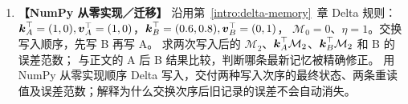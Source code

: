 \begin{enumerate}[label={},leftmargin=4.8em,itemsep=4pt]
\item[\textbf{C-135.}] \leavevmode{}\label{exercise:C-135}\label{exercise:delta-write-order}\label{exercise:delta-reverse}
\textbf{【NumPy 从零实现／迁移】} 沿用第~\ref*{intro:delta-memory}~章 Delta 规则：
$\boldsymbol{k}_A^\top=(1,0),\boldsymbol{v}_A^\top=(1,0)$，$\boldsymbol{k}_B^\top=(0.6,0.8),\boldsymbol{v}_B^\top=(0,1)$，
$\mathcal{M}_0=0$、$\eta=1$。交换写入顺序，先写 B 再写 A。
求两次写入后的 $\mathcal{M}_2$、$\boldsymbol{k}_A^\top\mathcal{M}_2$、$\boldsymbol{k}_B^\top\mathcal{M}_2$ 和 B 的误差范数；
与正文的 A 后 B 结果比较，判断哪条最新记忆被精确修正。 用 NumPy 从零实现顺序 Delta 写入，交付两种写入次序的最终状态、两条重读值及误差范数；解释为什么交换次序后旧记录的误差不会自动消失。
\end{enumerate}
